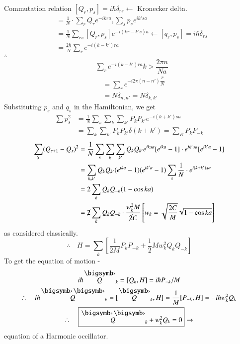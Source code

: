 Commutation relation $[Q_{r},p_{s}]=i\hbar \delta_{rs} \leftarrow$ Kronecker delta.
\begin{align*}
[Q_{k},P_{k'}] &= \frac{1}{N}\cdot \sum\limits_{r}Q_{r}e^{-ikra}, \sum\limits_{s}p_{s}e^{ik'sa}\\
&= \frac{1}{N}\sum\limits_{rs}[Q_{r},p_{s}]e^{-i(kr-k's)a}\leftarrow [q_{r},p_{s}]=i\hbar \delta_{rs}\\
&= \frac{2\hbar}{N}\sum\limits_{r}e^{-i(k-k')ra}
\end{align*}
$\therefore \ $ 
\begin{align*}
& \sum\limits_{r}e^{-i(k-k')ra}k>\dfrac{2\pi n}{Na}\\
&\quad =\sum\limits_{r}e^{-i2\pi(n-n')\dfrac{r}{N}}\\
&\quad =N\delta_{n,n'}=N\delta_{k,k'}
\end{align*}
Substituting $p_{s}$ and $q_{s}$ in the Hamiltonian, we get
\begin{align*}
\sum p^{2}_{s} &= \frac{1}{N}\sum\limits_{s}\sum\limits_{k}\sum\limits_{k'}P_{k}P_{k'}e^{-i(k+k')sa}\\
&= \sum\limits_{k}\sum\limits_{k'}P_{k}P_{k'}\delta(k+k')=\sum\limits_{R}P_{k}P_{-k}
\end{align*}
\begin{align*}
\sum\limits_{S}(Q_{s+1}-Q_{s})^{2} &= \frac{1}{N}\sum\limits_{s}\sum\limits_{k}\sum\limits_{k'}Q_{k}Q_{k'}e^{iksa}[e^{ika}-1]\cdot e^{ik'sa}[e^{ik'a}-1]\\
&=\sum\limits_{k,k'}Q_{k}Q_{k'}(e^{ika}-1)(e^{ik'a}-1)\sum\limits_{s}\frac{1}{N}\cdot e^{i(k+k')sa}\\
&= 2\sum\limits_{k}Q_{k}Q_{-k}(1-\cos ka)\\
&= \cancel{2}\sum\limits_{k}Q_{k}Q_{-k}\cdot \dfrac{w^{2}_{k}M}{\cancel{2}C} \left[w_{k}=\sqrt{\dfrac{2C}{M}}\sqrt{1-\cos ka}\right]
\end{align*}
as considered classically.
$$
\therefore\quad H=\sum\limits_{k}\left[\frac{1}{2M}P_{k}P_{-k}+\frac{1}{2}Mw^{2}_{k}Q_{k}Q_{-k}\right]
$$
To get the equation of motion -
\begin{gather*}
i\hbar \overdot{Q}_{k}=[Q_{k},H]=i\hbar P_{-k}/M\\
\therefore\quad i\hbar \overddot{Q}_{k}=[\overdot{Q}_{k},H]=\dfrac{1}{M}[P_{-k},H]=-i\hbar w^{2}_{k}Q_{k}\\
\therefore\quad \fbox{$\overddot{Q}_{k}+w^{2}_{k}Q_{k}=0$}\to
\end{gather*}
equation of a Harmonic occillator.

